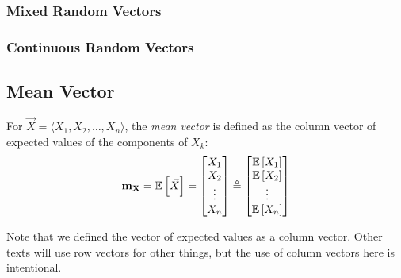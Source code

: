 		\subsubsection{Mixed Random Vectors} \label{subsubsec:Conditional Probability Mixed Random Vectors}
		
		
		\subsubsection{Continuous Random Vectors} \label{subsubsec:Conditional Probability Continuous Random Vectors}
		
	\subsection{Mean Vector} \label{subsec:Mean Vector}
		\begin{definition} \label{def:Mean Vector}
			For $\vec{X} = \langle X_{1},X_{2},\ldots,X_{n} \rangle$, the \emph{mean vector} is defined as the column vector of expected values of the components of $X_{k}$:
			\begin{equation} \label{eq:Mean Vector}
				\mathbf{m_{X}}
				= \operatorname{\operatorname{\mathbb{E}}} \left[ \vec{X} \right]
				= \begin{bmatrix}
					X_{1} \\
					X_{2} \\
					\vdots \\
					X_{n}
				\end{bmatrix}
				\triangleq \begin{bmatrix}
					\operatorname{\operatorname{\mathbb{E}}} \left[ X_{1} \right] \\
					\operatorname{\operatorname{\mathbb{E}}} \left[ X_{2} \right] \\
					\vdots \\
					\operatorname{\operatorname{\mathbb{E}}} \left[ X_{n} \right] \\
				\end{bmatrix}
			\end{equation}
			\begin{remark}
				Note that we defined the vector of expected values as a column vector.
				Other texts will use row vectors for other things, but the use of column vectors here is intentional.
			\end{remark}
		\end{definition}
	
